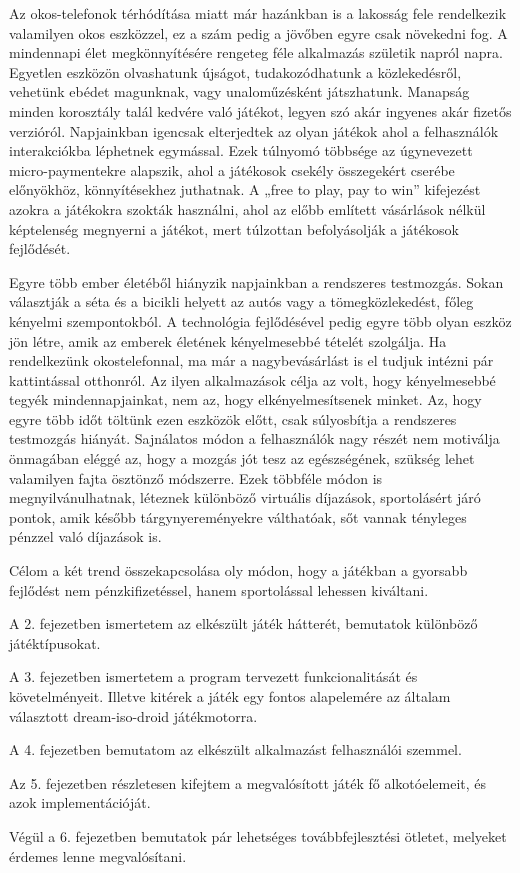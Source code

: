Az okos-telefonok térhódítása miatt már hazánkban is a lakosság fele rendelkezik valamilyen okos eszközzel, ez a szám pedig a jövőben egyre csak növekedni fog. 
A mindennapi élet megkönnyítésére rengeteg féle alkalmazás születik napról napra. 
Egyetlen eszközön olvashatunk újságot, tudakozódhatunk a közlekedésről, vehetünk ebédet magunknak, vagy unaloműzésként játszhatunk. 
Manapság minden korosztály talál kedvére való játékot, legyen szó akár ingyenes akár fizetős verzióról. 
Napjainkban igencsak elterjedtek az olyan játékok ahol a felhasználók interakciókba léphetnek egymással. 
Ezek túlnyomó többsége az úgynevezett micro-paymentekre alapszik, ahol a játékosok csekély összegekért cserébe előnyökhöz, könnyítésekhez juthatnak. 
A „free to play, pay to win” kifejezést azokra a játékokra szokták használni, ahol az előbb említett vásárlások nélkül képtelenség megnyerni a játékot, mert túlzottan befolyásolják a játékosok fejlődését.

Egyre több ember életéből hiányzik napjainkban a rendszeres testmozgás. 
Sokan választják a séta és a bicikli helyett az autós vagy a tömegközlekedést, főleg kényelmi szempontokból. 
A technológia fejlődésével pedig egyre több olyan eszköz jön létre, amik az emberek életének kényelmesebbé tételét szolgálja. 
Ha rendelkezünk okostelefonnal, ma már a nagybevásárlást is el tudjuk intézni pár kattintással otthonról. 
Az ilyen alkalmazások célja az volt, hogy kényelmesebbé tegyék mindennapjainkat, nem az, hogy elkényelmesítsenek minket. 
Az, hogy egyre több időt töltünk ezen eszközök előtt, csak súlyosbítja a rendszeres testmozgás hiányát. 
Sajnálatos módon a felhasználók nagy részét nem motiválja önmagában eléggé az, hogy a mozgás jót tesz az egészségének, szükség lehet valamilyen fajta ösztönző módszerre. 
Ezek többféle módon is megnyilvánulhatnak, léteznek különböző virtuális díjazások, sportolásért járó pontok, amik később tárgynyereményekre válthatóak, sőt vannak tényleges pénzzel való díjazások is.

Célom a két trend összekapcsolása oly módon, hogy a játékban a gyorsabb fejlődést nem pénzkifizetéssel, hanem sportolással lehessen kiváltani. 

A 2. fejezetben ismertetem az elkészült játék hátterét, bemutatok különböző játéktípusokat. 

A 3. fejezetben ismertetem a program tervezett funkcionalitását és követelményeit. 
Illetve kitérek a játék egy fontos alapelemére az általam választott dream-iso-droid játékmotorra. 

A 4. fejezetben bemutatom az elkészült alkalmazást felhasználói szemmel. 

Az 5. fejezetben részletesen kifejtem a megvalósított játék fő alkotóelemeit, és azok implementációját. 

Végül a 6. fejezetben bemutatok pár lehetséges továbbfejlesztési ötletet, melyeket érdemes lenne megvalósítani. 